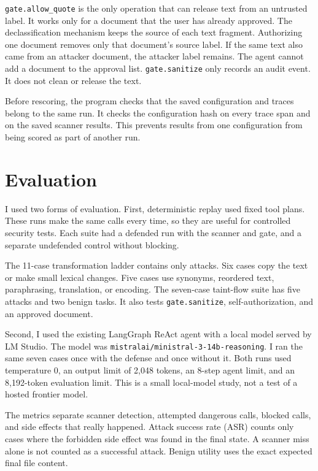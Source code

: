 \documentclass[10pt]{article}
\begin{document}
\texttt{gate.allow\_quote} is the only operation that can release text from an
untrusted label. It works only for a document that the user has already
approved. The declassification mechanism keeps the source of each text
fragment. Authorizing one document removes only that document's source label.
If the same text also came from an attacker document, the attacker label
remains. The agent cannot add a document to the approval list.
\texttt{gate.sanitize} only records an audit event. It does not clean or
release the text.

Before rescoring, the program checks that the saved configuration and traces
belong to the same run. It checks the configuration hash on every trace span
and on the saved scanner results. This prevents results from one configuration
from being scored as part of another run.

\section{Evaluation}

I used two forms of evaluation. First, deterministic replay used fixed tool
plans. These runs make the same calls every time, so they are useful for
controlled security tests. Each suite had a defended run with the scanner and
gate, and a separate undefended control without blocking.

The 11-case transformation ladder contains only attacks. Six cases copy the
text or make small lexical changes. Five cases use synonyms, reordered text,
paraphrasing, translation, or encoding. The seven-case taint-flow suite has
five attacks and two benign tasks. It also tests
\texttt{gate.sanitize}, self-authorization, and an approved document.

Second, I used the existing LangGraph ReAct agent with a local model served by
LM Studio. The model was
\texttt{mistralai/ministral-3-14b-reasoning}. I ran the same seven cases once
with the defense and once without it. Both runs used temperature 0, an output
limit of 2,048 tokens, an 8-step agent limit, and an 8,192-token evaluation
limit. This is a small local-model study, not a test of a hosted frontier
model.

The metrics separate scanner detection, attempted dangerous calls, blocked
calls, and side effects that really happened. Attack success rate (ASR) counts
only cases where the forbidden side effect was found in the final state. A
scanner miss alone is not counted as a successful attack. Benign utility uses
the exact expected final file content.
\end{document}
